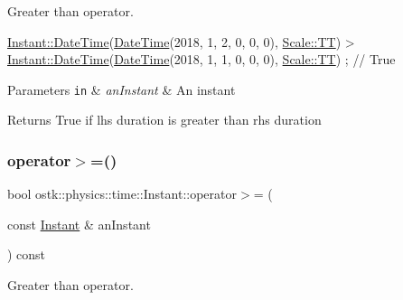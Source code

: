 Greater than operator. 


\begin{DoxyCode}
\hyperlink{classostk_1_1physics_1_1time_1_1_instant_afd5725574a02389b80fad4baff313c8a}{Instant::DateTime}(\hyperlink{classostk_1_1physics_1_1time_1_1_instant_afd5725574a02389b80fad4baff313c8a}{DateTime}(2018, 1, 2, 0, 0, 0), 
      \hyperlink{namespaceostk_1_1physics_1_1time_adf23d37bd8641fb76a0e98ab46a70df7adf1f3edb9115acb0a1e04209b7a9937b}{Scale::TT}) > \hyperlink{classostk_1_1physics_1_1time_1_1_instant_afd5725574a02389b80fad4baff313c8a}{Instant::DateTime}(\hyperlink{classostk_1_1physics_1_1time_1_1_instant_afd5725574a02389b80fad4baff313c8a}{DateTime}(2018, 1, 1, 0, 0, 0), 
      \hyperlink{namespaceostk_1_1physics_1_1time_adf23d37bd8641fb76a0e98ab46a70df7adf1f3edb9115acb0a1e04209b7a9937b}{Scale::TT}) ; \textcolor{comment}{// True}
\end{DoxyCode}



\begin{DoxyParams}[1]{Parameters}
\mbox{\tt in}  & {\em an\+Instant} & An instant \\
\hline
\end{DoxyParams}
\begin{DoxyReturn}{Returns}
True if lhs duration is greater than rhs duration 
\end{DoxyReturn}
\mbox{\label{classostk_1_1physics_1_1time_1_1_instant_af5370a5e8c4b39f46f2baf79105b35cc}} 
\subsubsection{\texorpdfstring{operator$>$=()}{operator>=()}}
{\footnotesize\ttfamily bool ostk\+::physics\+::time\+::\+Instant\+::operator$>$= (\begin{DoxyParamCaption}\item[{const \hyperlink{classostk_1_1physics_1_1time_1_1_instant}{Instant} \&}]{an\+Instant }\end{DoxyParamCaption}) const}



Greater than operator. 


